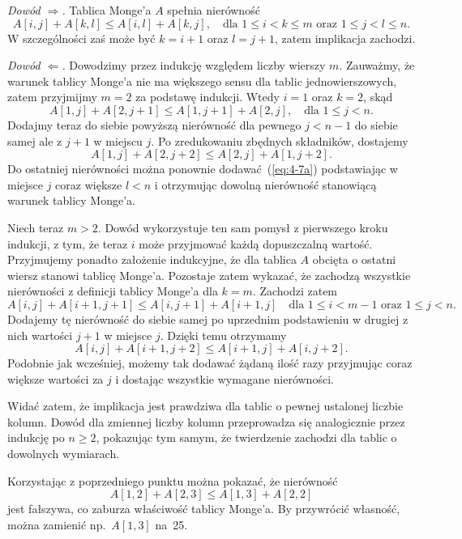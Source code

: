
\subproblem %
\noindent\emph{Dowód $\Rightarrow$.} Tablica Monge'a $A$ spełnia nierówność
\[
	A[i,j]+A[k,l] \le A[i,l]+A[k,j], \quad\text{dla $1\le i<k\le m$ oraz $1\le j<l\le n$}.
\]
W szczególności zaś może być $k=i+1$ oraz $l=j+1$, zatem implikacja zachodzi.
\bigskip

\noindent\emph{Dowód $\Leftarrow$.} Dowodzimy przez indukcję względem liczby wierszy $m$. Zauważmy, że warunek tablicy Monge'a nie ma większego sensu dla tablic jednowierszowych, zatem przyjmijmy $m=2$ za podstawę indukcji. Wtedy $i=1$ oraz $k=2$, skąd
\begin{equation}
	A[1,j]+A[2,j+1] \le A[1,j+1]+A[2,j], \quad\text{dla $1\le j<n$}. \label{eq:4-7a}
\end{equation}
Dodajmy teraz do siebie powyższą nierówność dla pewnego $j<n-1$ do siebie samej ale z $j+1$ w miejscu $j$. Po zredukowaniu zbędnych składników, dostajemy
\[
	A[1,j]+A[2,j+2] \le A[2,j]+A[1,j+2].
\]
Do ostatniej nierówności można ponownie dodawać~(\ref{eq:4-7a}) podstawiając w miejsce $j$ coraz większe $l<n$ i otrzymując dowolną nierówność stanowiącą warunek tablicy Monge'a.

Niech teraz $m>2$. Dowód wykorzystuje ten sam pomysł z pierwszego kroku indukcji, z tym, że teraz $i$ może przyjmować każdą dopuszczalną wartość. Przyjmujemy ponadto założenie indukcyjne, że dla tablica $A$ obcięta o ostatni wiersz stanowi tablicę Monge'a. Pozostaje zatem wykazać, że zachodzą wszystkie nierówności z definicji tablicy Monge'a dla $k=m$. Zachodzi zatem
\[
	A[i,j]+A[i+1,j+1] \le A[i,j+1]+A[i+1,j] \quad\text{dla $1\le i<m-1$ oraz $1\le j<n$}.
\]
Dodajemy tę nierówność do siebie samej po uprzednim podstawieniu w drugiej z nich wartości $j+1$ w miejsce $j$. Dzięki temu otrzymamy
\[
	A[i,j]+A[i+1,j+2] \le A[i+1,j]+A[i,j+2].
\]
Podobnie jak wcześniej, możemy tak dodawać żądaną ilość razy przyjmując coraz większe wartości za $j$ i dostając wszystkie wymagane nierówności.

Widać zatem, że implikacja jest prawdziwa dla tablic o pewnej ustalonej liczbie kolumn. Dowód dla zmiennej liczby kolumn przeprowadza się analogicznie przez indukcję po $n\ge2$, pokazując tym samym, że twierdzenie zachodzi dla tablic o dowolnych wymiarach.

\subproblem %
Korzystając z poprzedniego punktu można pokazać, że nierówność
\[
	A[1,2]+A[2,3] \le A[1,3]+A[2,2]
\]
jest fałszywa, co zaburza właściwość tablicy Monge'a. By przywrócić własność, można zamienić np.\ $A[1,3]$ na~25.

